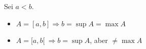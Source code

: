 Sei $a < b$.
\begin{itemize}
    \item $A = [a, b] \Rightarrow b = \sup A = \max A$
    \item $A = [a, b[ \ \Rightarrow b = \sup A$, aber $\neq \max A$
\end{itemize}